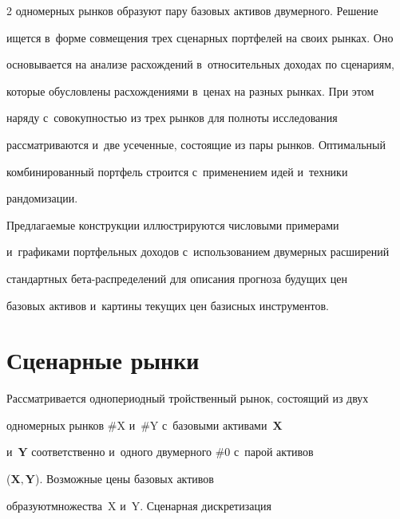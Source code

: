 \begin{multicols}{2}
одномерных рынков образуют пару базовых активов двумерного. Решение 


ищется в~форме совмещения трех сценарных портфелей на своих рынках. Оно 


основывается на анализе расхождений в~относительных доходах по сценариям, 


которые обусловлены расхождениями в~ценах на разных рынках. При этом 


наряду с~совокупностью из трех рынков для полноты исследования 


рассматриваются и~две усеченные, состоящие из пары рынков. Оптимальный 


комбинированный портфель строится с~применением идей и~техники 


рандомизации. 


  


  Предлагаемые конструкции иллюстрируются числовыми примерами 


и~графиками портфельных доходов с~использованием двумерных расширений 


стандартных бе\-та-рас\-пре\-де\-ле\-ний для описания прогноза будущих цен 


базовых активов и~картины текущих цен базисных инструментов.





\vspace*{-9pt} 


  


  \section{Сценарные рынки}


  


  \vspace*{-2pt}


  


  Рассматривается однопериодный тройственный рынок, состоящий из двух 


одномерных рынков \#X и~\#Y с~базовыми активами~$\boldsymbol{X}$ 


и~$\boldsymbol{Y}$ соответственно и~одного двумерного \#0 с~парой активов 


($\boldsymbol{X}, \boldsymbol{Y}$). Возможные цены базовых активов 


образуют\linebreak множества~{\sf X} и~{\sf Y}. Сценарная дискретизация\linebreak



\end{multicols}
